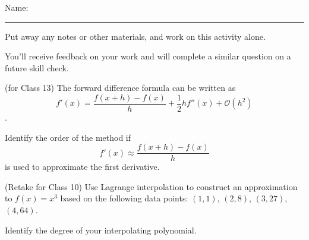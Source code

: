 \documentclass[12pt,letterpaper,noanswers]{exam}
\begin{document}
 \pdfpageheight 11in 
  \pdfpagewidth 8.5in

\noindent Name: \rule{2.5in}{0.5pt}

\noindent Put away any notes or other materials, and work on this activity alone.

\noindent You'll receive feedback on your work and will complete a similar question on a future skill check.


\begin{questions}
\item (for Class 13)
The forward difference formula can be written as \[f'(x) = \dfrac{f(x+h)-f(x)}{h} + \frac{1}{2} hf''(x) + \mathcal{O}(h^2)\].  

Identify the order of the method if 
\[f'(x) \approx  \dfrac{f(x+h)-f(x)}{h}\]
is used to approximate the first derivative.

\vspace{4cm}

\item (Retake for Class 10)
Use Lagrange interpolation to construct an approximation to $f(x) = x^3$ based on the following data points: $(1,1)$, $(2,8)$, $(3,27)$, $(4,64)$.

Identify the degree of your interpolating polynomial.
\end{questions}
\end{document}
